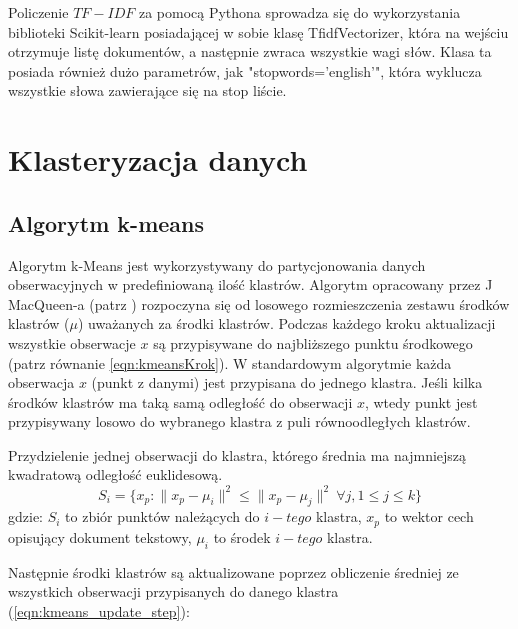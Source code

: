         \newpage
        Policzenie $TF-IDF$ za pomocą Pythona sprowadza się do wykorzystania biblioteki Scikit-learn posiadającej w sobie klasę TfidfVectorizer, która na wejściu otrzymuje listę dokumentów, a następnie zwraca wszystkie wagi słów. Klasa ta posiada również dużo parametrów, jak "stopwords='english'", która wyklucza wszystkie słowa zawierające się na stop liście.
        
        
        \newpage
        
\section{Klasteryzacja danych}
    \subsection{Algorytm k-means} \label{sec:kmeans}
    Algorytm k-Means jest wykorzystywany do partycjonowania danych obserwacyjnych w predefiniowaną ilość klastrów. Algorytm opracowany przez J MacQueen-a (patrz \cite{macqueen1967}) rozpoczyna się od losowego rozmieszczenia zestawu środków klastrów ($\mu$) uważanych za środki klastrów. Podczas każdego kroku aktualizacji wszystkie obserwacje $x$ są przypisywane do najbliższego punktu środkowego (patrz równanie \ref{eqn:kmeansKrok}). W standardowym algorytmie każda obserwacja $x$ (punkt z danymi) jest przypisana do jednego klastra. Jeśli kilka środków klastrów ma taką samą odległość do obserwacji $x$, wtedy punkt jest przypisywany losowo do wybranego klastra z puli równoodległych klastrów.
    
    Przydzielenie jednej obserwacji do klastra, którego średnia ma najmniejszą kwadratową odległość euklidesową. 
    \begin{equation}
        S_i = \big \{ x_p : \big \| x_p - \mu_i \big \|^2 \le \big \| x_p - \mu_j \big \|^2 \ \forall j, 1 \le j \le k \big\}
        \label{eqn:kmeansKrok}
    \end{equation}
    gdzie: $S_i$ to zbiór punktów należących do $i-tego$ klastra, $x_p$ to wektor cech opisujący dokument tekstowy, $\mu_i$ to środek $i-tego$ klastra.
    
    Następnie środki klastrów są aktualizowane poprzez obliczenie średniej ze wszystkich obserwacji przypisanych do danego klastra (\ref{eqn:kmeans_update_step}):

